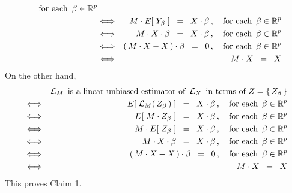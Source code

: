 \begin{enumerate}
\begin{eqnarray*}
		\quad\textnormal{for each \,$\beta\in\Re^{p}$}
	\\
	&\Longleftrightarrow&
		M \cdot E\!\left[\; Y_{\beta} \;\right] \;\;=\;\; X \cdot \beta\,,
		\quad\textnormal{for each \,$\beta\in\Re^{p}$}
	\\
	&\Longleftrightarrow&
		M \cdot X \cdot \beta \;\;=\;\; X \cdot \beta\,,
		\quad\textnormal{for each \,$\beta\in\Re^{p}$}
	\\
	&\Longleftrightarrow&
		\left(\,M \cdot X - X\,\right) \cdot \beta \;\;=\;\; 0\,,
		\quad\textnormal{for each \,$\beta\in\Re^{p}$}
	\\
	&\Longleftrightarrow&
		M \cdot X \;\; = \;\; X
	\end{eqnarray*}
	On the other hand,
	\begin{eqnarray*}
	&&
		\textnormal{$\mathcal{L}_{M}$\, is a linear unbiased estimator of \,$\mathcal{L}_{X}$\,
		in terms of $Z = \{\,Z_{\beta}\,\}$}
	\\
	&\Longleftrightarrow&
		E\!\left[\;\mathcal{L}_{M}(\,Z_{\beta}\,)\;\right] \;\;=\;\; X \cdot \beta\,,
		\quad\textnormal{for each \,$\beta\in\Re^{p}$}
	\\
	&\Longleftrightarrow&
		E\!\left[\; M \cdot Z_{\beta} \;\right] \;\;=\;\; X \cdot \beta\,,
		\quad\textnormal{for each \,$\beta\in\Re^{p}$}
	\\
	&\Longleftrightarrow&
		M \cdot E\!\left[\; Z_{\beta} \;\right] \;\;=\;\; X \cdot \beta\,,
		\quad\textnormal{for each \,$\beta\in\Re^{p}$}
	\\
	&\Longleftrightarrow&
		M \cdot X \cdot \beta \;\;=\;\; X \cdot \beta\,,
		\quad\textnormal{for each \,$\beta\in\Re^{p}$}
	\\
	&\Longleftrightarrow&
		\left(\,M \cdot X - X\,\right) \cdot \beta \;\;=\;\; 0\,,
		\quad\textnormal{for each \,$\beta\in\Re^{p}$}
	\\
	&\Longleftrightarrow&
		M \cdot X \;\; = \;\; X
	\end{eqnarray*}
	This proves Claim 1.
		

\end{enumerate}
